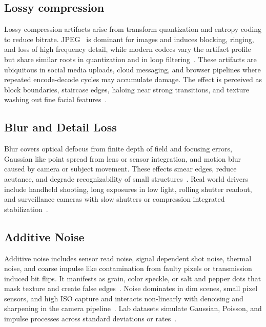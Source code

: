 \subsection{Lossy compression}\label{sec:compression}

Lossy compression artifacts arise from transform quantization and entropy coding to reduce bitrate. \acf{JPEG}~\cite{jpeg} is dominant for images and induces blocking, ringing, and loss of high frequency detail, while modern codecs vary the artifact profile but share similar roots in quantization and in loop filtering~\cite{rabbani1991digital,survey2025compression}. These artifacts are ubiquitous in social media uploads, cloud messaging, and browser pipelines where repeated encode-decode cycles may accumulate damage. The effect is perceived as block boundaries, staircase edges, haloing near strong transitions, and texture washing out fine facial features~\cite{survey2006wang,survey2019shahrukh}.

\subsection{Blur and Detail Loss}\label{sec:blur}

Blur covers optical defocus from finite depth of field and focusing errors, Gaussian like point spread from lens or sensor integration, and motion blur caused by camera or subject movement. These effects smear edges, reduce acutance, and degrade recognizability of small structures~\cite{gonzalez2009digital,survey2020zhai}. Real world drivers include handheld shooting, long exposures in low light, rolling shutter readout, and surveillance cameras with slow shutters or compression integrated stabilization~\cite{survey2017aquisition,sheikh2006live}.

\subsection{Additive Noise}\label{sec:noise}

Additive noise includes sensor read noise, signal dependent shot noise, thermal noise, and coarse impulse like contamination from faulty pixels or transmission induced bit flips. It manifests as grain, color speckle, or salt and pepper dots that mask texture and create false edges~\cite{survey2023denoising,gonzalez2009digital}. Noise dominates in dim scenes, small pixel sensors, and high \acs{ISO} capture and interacts non-linearly with denoising and sharpening in the camera pipeline~\cite{survey2017aquisition}. Lab datasets simulate Gaussian, Poisson, and impulse processes across standard deviations or rates~\cite{sheikh2006live,tid2013,kadid10k}.


